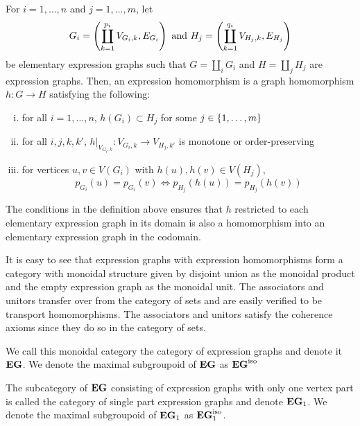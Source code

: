 \documentclass[./Thick_TQFTs_and_Quantum_Information.tex]{subfiles}
\begin{document}
\begin{defn}
For $i = 1, \dots, n$ and $j = 1, \dots, m$, let
\[
  G_i = \left( \coprod_{k = 1}^{p_i} V_{G_i, k}, E_{G_i} \right) \text{ and }
  H_j = \left( \coprod_{k = 1}^{q_i} V_{H_j, k}, E_{H_j} \right)
\]
be elementary expression graphs such that $G = \coprod_{i} G_i$ and
$H = \coprod_{j} H_j$ are expression graphs. Then, an expression homomorphism is
a graph homomorphism $h : G \to H$ satisfying the following:
\begin{enumerate}[(i)]

\item for all $i = 1, \dots, n$, $h(G_i) \subset H_j$ for some
$j \in \set{1, \dots, m}$

\item for all $i, j, k, k'$, $h|_{V_{G_i, k}} : V_{G_i, k} \to V_{H_j, k'}$ is
monotone or order-preserving

\item for vertices $u, v \in V(G_i)$ with $h(u), h(v) \in V(H_j)$,
\[
  p_{G_i}(u) = p_{G_i}(v) \iff p_{H_j}(h(u)) = p_{H_j}(h(v))
\]
\end{enumerate}
\end{defn}

\begin{rmk}
The conditions in the definition above ensures that $h$ restricted to each
elementary expression graph in its domain is also a homomorphism into an
elementary expression graph in the codomain.
\end{rmk}

It is easy to see that expression graphs with expression homomorphisms form a
category with monoidal structure given by disjoint union as the monoidal product
and the empty expression graph as the monoidal unit. The associators and unitors
transfer over from the category of sets and are easily verified to be transport
homomorphisms. The associators and unitors satisfy the coherence axioms since
they do so in the category of sets. 

\begin{defn}
We call this monoidal category the category of expression graphs and denote it
$\textbf{EG}$. We denote the maximal subgroupoid of $\textbf{EG}$ as $\textbf{EG}^{\text{iso}}$
\end{defn}

\begin{defn}
The subcategory of $\textbf{EG}$ consisting of expression graphs with only one vertex
part is called the category of single part expression graphs and denote $\textbf{EG}_1$.
We denote the maximal subgroupoid of $\textbf{EG}_1$ as $\textbf{EG}_1^{\text{iso}}$.
\end{defn}
\end{document}
